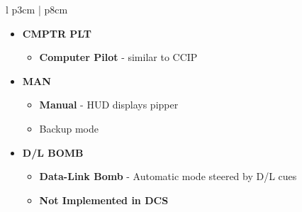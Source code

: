 \documentclass[8pt,usenames,dvipsnames,twoside]{article}
\begin{document}
\begin{center}
\begin{longtable}{l p{3cm} | p{8cm}}
\begin{minipage}[t]{\linewidth}
\begin{itemize}
\begin{itemize}
						\end{itemize}
						\item \textbf{CMPTR PLT}
						\begin{itemize}
							\item \textbf{Computer Pilot} - similar to CCIP
						\end{itemize}
						\item \textbf{MAN}
						\begin{itemize}
							\item \textbf{Manual} - HUD displays pipper
							\item Backup mode
						\end{itemize}
						\item \textbf{D/L BOMB}
						\begin{itemize}
							\item \textbf{Data-Link Bomb} - Automatic mode steered by D/L cues
							\item \textbf{Not Implemented in DCS}
						\end{itemize}
					\end{itemize}
				\end{minipage} \\
				\bottomrule
			\end{longtable}
		\end{center}
		
	
\end{document}
